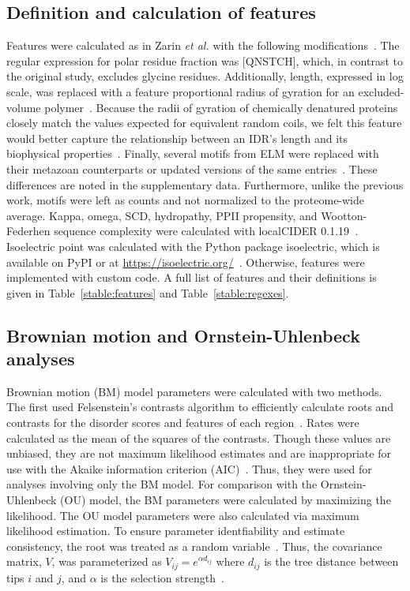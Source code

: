 \subsection{Definition and calculation of features}
Features were calculated as in Zarin \textit{et al.} with the following modifications~\cite{Zarin2019}. The regular expression for polar residue fraction was [QNSTCH], which, in contrast to the original study, excludes glycine residues. Additionally, length, expressed in log scale, was replaced with a feature proportional radius of gyration for an excluded-volume polymer~\cite{Flory1949}. Because the radii of gyration of chemically denatured proteins closely match the values expected for equivalent random coils, we felt this feature would better capture the relationship between an IDR's length and its biophysical properties~\cite{Kohn2004}. Finally, several motifs from ELM were replaced with their metazoan counterparts or updated versions of the same entries~\cite{Kumar2021}. These differences are noted in the supplementary data. Furthermore, unlike the previous work, motifs were left as counts and not normalized to the proteome-wide average. Kappa, omega, SCD, hydropathy, PPII propensity, and Wootton-Federhen sequence complexity were calculated with localCIDER 0.1.19~\cite{Holehouse2017}. Isoelectric point was calculated with the Python package isoelectric, which is available on PyPI or at \url{https://isoelectric.org/}~\cite{Kozlowski2016}. Otherwise, features were implemented with custom code. A full list of features and their definitions is given in Table~\ref{stable:features} and Table~\ref{stable:regexes}.

\subsection{Brownian motion and Ornstein-Uhlenbeck analyses}
Brownian motion (BM) model parameters were calculated with two methods. The first used Felsenstein's contrasts algorithm to efficiently calculate roots and contrasts for the disorder scores and features of each region~\cite{Felsenstein1973, Felsenstein1981}. Rates were calculated as the mean of the squares of the contrasts. Though these values are unbiased, they are not maximum likelihood estimates and are inappropriate for use with the Akaike information criterion (AIC)~\cite{Akaike1974}. Thus, they were used for analyses involving only the BM model. For comparison with the Ornstein-Uhlenbeck (OU) model, the BM parameters were calculated by maximizing the likelihood. The OU model parameters were also calculated via maximum likelihood estimation. To ensure parameter identfiability and estimate consistency, the root was treated as a random variable~\cite{Ho2013, Ho2014}. Thus, the covariance matrix, $V$, was parameterized as $V_{ij} = e^{\alpha d_{ij}}$ where $d_{ij}$ is the tree distance between tips $i$ and $j$, and $\alpha$ is the selection strength~\cite{Ho2013}.

